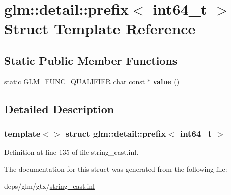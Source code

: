 \hypertarget{structglm_1_1detail_1_1prefix_3_01int64__t_01_4}{}\section{glm\+:\+:detail\+:\+:prefix$<$ int64\+\_\+t $>$ Struct Template Reference}
\label{structglm_1_1detail_1_1prefix_3_01int64__t_01_4}
\subsection*{Static Public Member Functions}
\begin{DoxyCompactItemize}
\item 
\mbox{\label{structglm_1_1detail_1_1prefix_3_01int64__t_01_4_a845043fc18700790972ca73ebc80ac4d}} 
static G\+L\+M\+\_\+\+F\+U\+N\+C\+\_\+\+Q\+U\+A\+L\+I\+F\+I\+ER \hyperlink{classchar}{char} const  $\ast$ {\bfseries value} ()
\end{DoxyCompactItemize}


\subsection{Detailed Description}
\subsubsection*{template$<$$>$\newline
struct glm\+::detail\+::prefix$<$ int64\+\_\+t $>$}



Definition at line 135 of file string\+\_\+cast.\+inl.



The documentation for this struct was generated from the following file\+:\begin{DoxyCompactItemize}
\item 
deps/glm/gtx/\hyperlink{string__cast_8inl}{string\+\_\+cast.\+inl}\end{DoxyCompactItemize}
